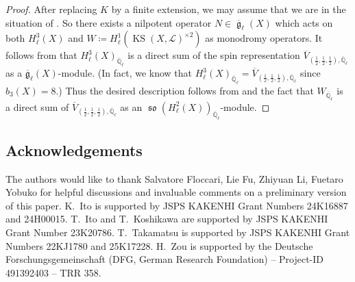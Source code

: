 \documentclass[12pt,reqno]{amsart}
\theoremstyle{definition}
\newcommand{\Q}{{\mathds Q}}
\renewcommand\ge{\mathop{\mathfrak{g}}\nolimits}
\newcommand\so{\mathop{\mathfrak{so}}\nolimits}
\newcommand\KS{\mathop{\mathrm{KS}}\nolimits}
\newcommand{\rfrg}{\overline{\mathfrak{g}}}
\newcommand{\scrL}{\mathscr{L}}
\numberwithin{equation}{section}
\begin{document}
\begin{proof}
    After replacing $K$ by a finite extension, we may assume that we are in the situation of .
    So there exists a nilpotent operator
    $N \in \overline{\ge}_\ell(X)$
    which acts on both $H^3_\ell(X)$ and $W\coloneqq H^1_\ell(\KS(X, \scrL)^{\times 2})$ as monodromy operators.
    It follows from \cite[Lemma 3.11]{Soldatenkov20a}
    that 
    $H^3_\ell(X)_{\overline{\Q}_\ell}$
    is a direct sum of the spin representation
    $\overline{V}_{(\frac{1}{2}, \frac{1}{2}, \frac{1}{2}), \overline{\Q}_\ell}$ as a $\rfrg_{\ell}(X)$-module.
    (In fact, we know that $H^3_\ell(X)_{\overline{\Q}_\ell}=\overline{V}_{(\frac{1}{2}, \frac{1}{2}, \frac{1}{2}), \overline{\Q}_\ell}$ since $b_3(X) =8$.)
    Thus the desired description follows from 
    and
    the fact that
    $W_{\overline{\Q}_\ell}$
    is a direct sum of $\overline{V}_{(\frac{1}{2}, \frac{1}{2}, \frac{1}{2}), \overline{\Q}_\ell}$
    as an $\so(H^2_\ell(X))_{\overline{\Q}_\ell}$-module.
\end{proof}







\subsection*{Acknowledgements}
The authors would like to thank Salvatore Floccari, Lie Fu, Zhiyuan Li, Fuetaro Yobuko for helpful discussions and invaluable comments on a preliminary version of this paper.
K.~Ito is supported by JSPS KAKENHI Grant Numbers 24K16887 and 24H00015.
T.~Ito and T.~Koshikawa are supported by JSPS KAKENHI Grant Number 23K20786. 
T.~Takamatsu is supported by JSPS KAKENHI Grant Numbers 22KJ1780 and 25K17228.
H.~Zou is supported by the Deutsche Forschungsgemeinschaft (DFG, German Research Foundation) – Project-ID 491392403 – TRR 358.

\printbibliography
\end{document}
